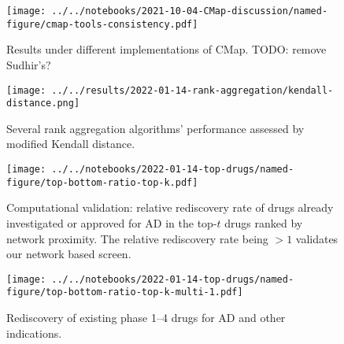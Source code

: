 \documentclass[letterpaper]{article}
\begin{document}
\begin{figure}[p]
\texttt{[image: ../../notebooks/2021-10-04-CMap-discussion/named-figure/cmap-tools-consistency.pdf]}
\caption{
Results under different implementations of CMap.
TODO: remove Sudhir's?
}
\label{fig:cmap-cmap}
\end{figure}

\begin{figure}[p]
\texttt{[image: ../../results/2022-01-14-rank-aggregation/kendall-distance.png]}
\caption{
Several rank aggregation algorithms' performance assessed by modified Kendall
distance.
}
\label{fig:kendall-dist}
\end{figure}

\begin{figure}[p]
\texttt{[image: ../../notebooks/2022-01-14-top-drugs/named-figure/top-bottom-ratio-top-k.pdf]}
\caption{
Computational validation: relative rediscovery rate of drugs already investigated or
approved for AD in the top-$t$ drugs ranked by network proximity.  The relative
rediscovery rate being $>1$ validates our network based screen.
}
\label{fig:ad-drug-rediscovery}
\end{figure}

\begin{figure}[p]
\texttt{[image: ../../notebooks/2022-01-14-top-drugs/named-figure/top-bottom-ratio-top-k-multi-1.pdf]}
\caption{
Rediscovery of existing phase 1--4 drugs for AD and other indications.
}
\label{fig:ad-drug-rediscovery-multi}
\end{figure}
\end{document}
